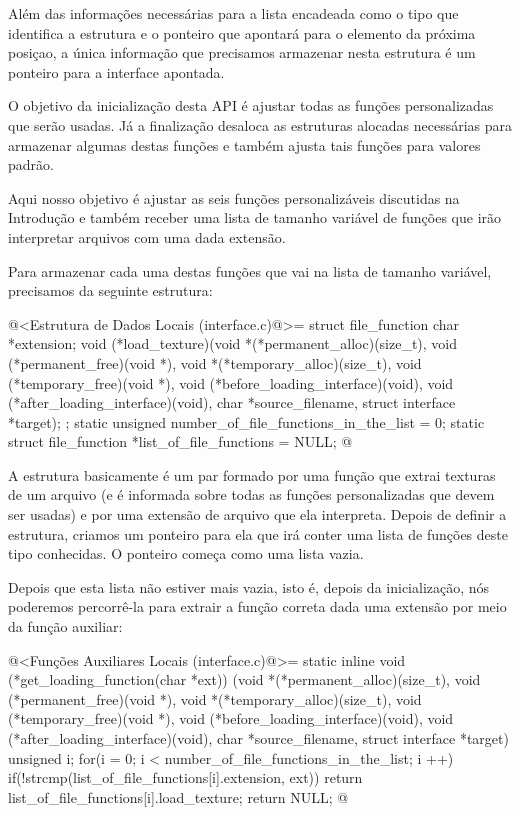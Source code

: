 Além das informações necessárias para a lista encadeada como o tipo
que identifica a estrutura e o ponteiro que apontará para o elemento
da próxima posiçao, a única informação que precisamos armazenar nesta
estrutura é um ponteiro para a interface apontada.


O objetivo da inicialização desta API é ajustar todas as funções
personalizadas que serão usadas. Já a finalização desaloca as
estruturas alocadas necessárias para armazenar algumas destas funções
e também ajusta tais funções para valores padrão.


Aqui nosso objetivo é ajustar as seis funções personalizáveis
discutidas na Introdução e também receber uma lista de tamanho
variável de funções que irão interpretar arquivos com uma dada
extensão.

Para armazenar cada uma destas funções que vai na lista de tamanho
variável, precisamos da seguinte estrutura:

\iniciocodigo
@<Estrutura de Dados Locais (interface.c)@>=
struct file_function {
  char *extension;
  void (*load_texture)(void *(*permanent_alloc)(size_t),
                      void (*permanent_free)(void *),
                      void *(*temporary_alloc)(size_t),
                      void (*temporary_free)(void *),
                      void (*before_loading_interface)(void),
                      void (*after_loading_interface)(void),
                      char *source_filename, struct interface *target);
};
static unsigned number_of_file_functions_in_the_list = 0;
static struct file_function *list_of_file_functions = NULL;
@
\fimcodigo

A estrutura basicamente é um par formado por uma função que extrai
texturas de um arquivo (e é informada sobre todas as funções
personalizadas que devem ser usadas) e por uma extensão de arquivo que
ela interpreta. Depois de definir a estrutura, criamos um ponteiro
para ela que irá conter uma lista de funções deste tipo conhecidas. O
ponteiro começa como uma lista vazia.

Depois que esta lista não estiver mais vazia, isto é, depois da
inicialização, nós poderemos percorrê-la para extrair a função correta
dada uma extensão por meio da função auxiliar:

\iniciocodigo
@<Funções Auxiliares Locais (interface.c)@>=
static inline void (*get_loading_function(char *ext))
                          (void *(*permanent_alloc)(size_t),
                           void (*permanent_free)(void *),
                           void *(*temporary_alloc)(size_t),
                           void (*temporary_free)(void *),
                           void (*before_loading_interface)(void),
                           void (*after_loading_interface)(void),
                           char *source_filename, struct interface *target){
  unsigned i;
  for(i = 0; i < number_of_file_functions_in_the_list; i ++){
    if(!strcmp(list_of_file_functions[i].extension, ext)){
      return list_of_file_functions[i].load_texture;
    }
  }
  return NULL;
}
@
\fimcodigo

